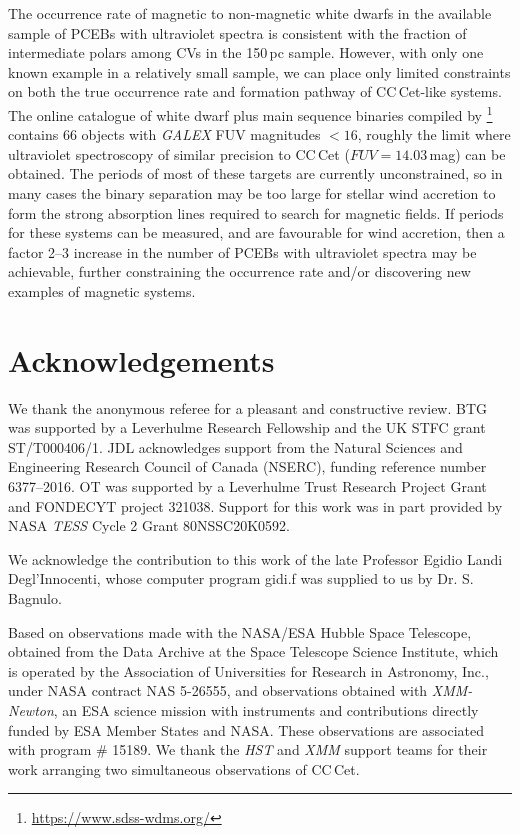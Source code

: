 \documentclass[fleqn,usenatbib]{mnras}
\begin{document}
The occurrence rate of magnetic to non-magnetic white dwarfs in the available sample of PCEBs with ultraviolet spectra is consistent with the fraction of intermediate polars among CVs in the 150\,pc sample. However, with only one known example in a relatively small sample, we can place only limited constraints on both the true occurrence rate and formation pathway of CC\,Cet-like
systems. The online catalogue of white dwarf plus main sequence binaries compiled by \citet{rebassa-mansergasetal12-1}\footnote{\url{https://www.sdss-wdms.org/}} contains 66 objects with \textit{GALEX} FUV magnitudes $<16$, roughly the limit where ultraviolet spectroscopy of similar precision to CC\,Cet ($FUV=14.03$\,mag) can be obtained. The periods of most of these targets are currently unconstrained, so in many cases the binary separation may be too large for stellar wind accretion to form the strong absorption lines required to search for magnetic fields. If periods for these systems can be measured, and are favourable for wind accretion, then a factor 2--3 increase in the number of PCEBs with ultraviolet spectra may be achievable, further constraining the occurrence rate and/or discovering new examples of magnetic systems.       

\section*{Acknowledgements}
We thank the anonymous referee for a pleasant and constructive review. BTG was supported by a Leverhulme Research Fellowship and the UK STFC grant ST/T000406/1. JDL acknowledges support from the Natural Sciences and Engineering Research Council of Canada (NSERC), funding reference number 6377--2016. OT was supported by a Leverhulme Trust Research Project Grant and FONDECYT project 321038. Support for this work was in part provided by NASA {\em TESS} Cycle 2 Grant 80NSSC20K0592.

We acknowledge the contribution to this work of the late Professor Egidio Landi Degl'Innocenti, whose computer program {\sc gidi.f} was supplied to us by Dr. S. Bagnulo.

Based on observations made with the NASA/ESA Hubble Space Telescope, obtained from the Data Archive at the Space Telescope Science Institute, which is operated by the Association of Universities for Research in Astronomy, Inc., under NASA contract NAS 5-26555, and observations obtained with \textit{XMM-Newton}, an ESA science mission with instruments and contributions directly funded by ESA Member States and NASA. These observations are associated with program \# 15189. We thank the {\em HST} and {\em XMM} support teams for their work arranging two simultaneous observations of CC\,Cet.
\end{document}
